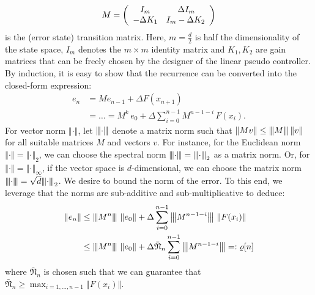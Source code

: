 \documentclass{article} %
\theoremstyle{definition}
\theoremstyle{remark}
\newcommand{\matnorm}[1]{{\left\vert\kern-0.25ex\left\vert\kern-0.25ex\left\vert #1 
    \right\vert\kern-0.25ex\right\vert\kern-0.25ex\right\vert}}
\newcommand{\specnorm}[1]{\matnorm{#1}_2}
\newcommand{\norm}[1]{\left\Vert#1\right\Vert}
\newcommand{\vc}[1]{#1}
\newcommand{\maxerrn}{\bar{\mathfrak N}} %
\newcommand{\tinc}{\ensuremath{ \Delta}}
\begin{document}
\begin{equation}
	M = \left(\begin{array}[h]{cc}
				I_m &  \, \tinc I_{m}\\
				-\tinc K_1 & I_m- \tinc K_2 
						\end{array}\right) 
\end{equation}
					is the (error state) transition matrix. 	
Here, $m = \frac d 2$ is half the dimensionality of the state space, $I_m$ denotes the $m \times m$ identity matrix and $K_1,K_2$ are gain matrices that can be freely chosen by the designer of the linear pseudo controller.		
By induction, it is easy to show that the recurrence can be converted into the closed-form expression:
\begin{align*}
	\vc e_n &= M \vc e_{n-1} + \tinc \vc F(x_{n+1})  \\ 
	&= \dots= M^k \, \vc e_0 + \tinc \sum_{i=0}^{n-1} M^{n-1-i} \, \vc F(x_i)	.	
\end{align*}	
For vector norm $\norm{\cdot}$, let $\matnorm{\cdot}$ denote a matrix norm such that $\norm{Mv} \leq \matnorm{M} \norm{v}$ for all suitable matrices $M$ and vectors $v$. For instance, for the Euclidean norm $\norm{\cdot} =\norm{\cdot}_2$, we can choose the spectral norm $\matnorm{\cdot}= \specnorm{\cdot}$ as a matrix norm. Or, for  $\norm{\cdot} =\norm{\cdot}_\infty$, if the vector space is $d$-dimensional, we can choose the matrix norm $\matnorm{\cdot}= \sqrt{d} \specnorm{\cdot}$. We desire to bound the  norm of the error. To this end, we leverage that the norms are sub-additive and sub-multiplicative to deduce: 
\begin{align}
	\norm{\vc e_n} &\leq   \matnorm{M^{n}} \, \norm{\vc e_0} + \tinc \sum_{i=0}^{n-1}  \matnorm{M^{n-1-i}} \, \norm{\vc F(x_i)}		\\
	&\leq \matnorm{M^{n}} \, \norm{\vc e_0} + \tinc \maxerrn_n	 \sum_{i=0}^{n-1}  \matnorm{M^{n-1-i}} =: \varrho[n]
	\label{ineq:errnormbasic}
\end{align}
where  $\maxerrn_n$ is chosen such that we can guarantee that $\maxerrn_n	\geq \max_{i=1,...,n-1} \norm{F(x_i)}$.
\end{document}
